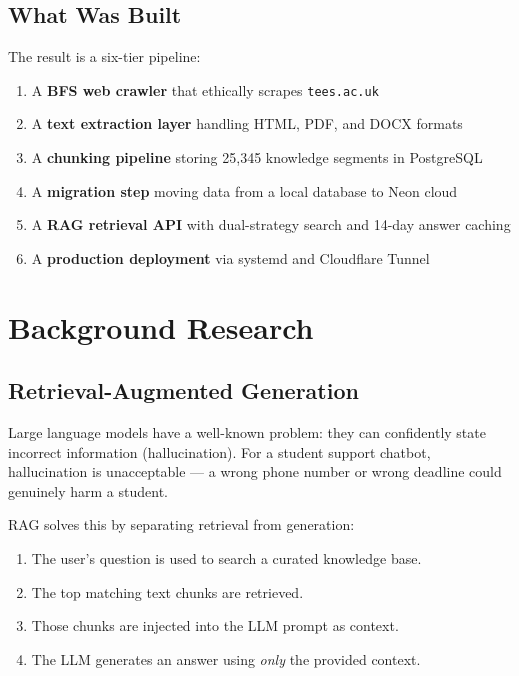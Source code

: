 \documentclass[12pt,a4paper]{report}
\begin{document}
\section{What Was Built}

The result is a six-tier pipeline:

\begin{enumerate}
    \item A \textbf{BFS web crawler} that ethically scrapes \texttt{tees.ac.uk}
    \item A \textbf{text extraction layer} handling HTML, PDF, and DOCX formats
    \item A \textbf{chunking pipeline} storing 25,345 knowledge segments in PostgreSQL
    \item A \textbf{migration step} moving data from a local database to Neon cloud
    \item A \textbf{RAG retrieval API} with dual-strategy search and 14-day answer caching
    \item A \textbf{production deployment} via systemd and Cloudflare Tunnel
\end{enumerate}

\chapter{Background Research}

\section{Retrieval-Augmented Generation}

Large language models have a well-known problem: they can confidently state incorrect information (hallucination). For a student support chatbot, hallucination is unacceptable --- a wrong phone number or wrong deadline could genuinely harm a student.

RAG solves this by separating retrieval from generation:
\begin{enumerate}
    \item The user's question is used to search a curated knowledge base.
    \item The top matching text chunks are retrieved.
    \item Those chunks are injected into the LLM prompt as context.
    \item The LLM generates an answer using \emph{only} the provided context.
\end{enumerate}
\end{document}
